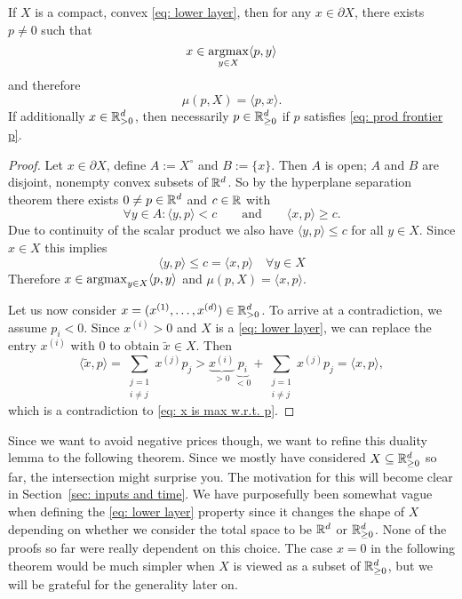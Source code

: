 \begin{lemma}
	\label{lem: duality of support function}
	If \(X\) is a compact, convex \ref{eq: lower
	layer}, then for any \(x\in \partial X\), there exists
	\(p\neq 0\) such that
	\begin{equation}
		\label{eq: prod frontier p}
		x \in \argmax_{y\in X} \langle p, y\rangle %
	\end{equation}
	and therefore
	\[
		\mu(p, X) = \langle p, x\rangle.
	\]
	If additionally \(x\in\mathbb{R}_{>0}^d\), then necessarily \(p\in\mathbb{R}_{\ge
	0}^d\) if \(p\) satisfies \eqref{eq: prod frontier p}.
\end{lemma}
\begin{proof}
	Let \(x\in \partial X\), define \(A:=X^\circ\) and \(B:=\{x\}\). Then \(A\)
	is open; \(A\) and \(B\) are disjoint, nonempty
	convex subsets of \(\mathbb{R}^d\). So by the hyperplane separation theorem
	there exists
	\(0\neq p\in\mathbb{R}^d\) and \(c\in\mathbb{R}\) with
	\[
		\forall y\in A : \langle y, p\rangle < c
		\qquad\text{and}\qquad
		\langle x, p\rangle \ge c.
	\]
	Due to continuity of the scalar product we also have \(\langle y, p\rangle
	\le c\) for all \(y\in X\). Since \(x\in X\) this implies
	\begin{equation}
		\label{eq: x is max w.r.t. p}
		\langle y, p\rangle \le c = \langle x, p\rangle \quad \forall y\in X
	\end{equation}
	Therefore \(x\in\operatorname*{argmax}_{y\in X} \langle p, y\rangle\) and \(\mu(p, X) =
	\langle x, p\rangle\).

	Let us now consider \(x=(x^{(1)},\dots,x^{(d)})\in\mathbb{R}_{>0}^d\).
	To arrive at a contradiction, we assume \(p_i < 0\). Since \(x^{(i)}>0\) and
	\(X\) is a \ref{eq: lower layer}, we can replace the entry \(x^{(i)}\) with
	\(0\) to obtain \(\tilde{x}\in X\). Then
	\[
		\langle \tilde{x}, p\rangle
		= \sum_{\substack{j=1\\i\neq j}} x^{(j)} p_j
		> \underbrace{x^{(i)}}_{>0}\underbrace{p_i}_{<0}
		+ \sum_{\substack{j=1\\i\neq j}} x^{(j)} p_j
		= \langle x, p\rangle,
	\]
	which is a contradiction to \eqref{eq: x is max w.r.t. p}.
\end{proof}

Since we want to avoid negative prices though, we want to refine this duality
lemma to the following theorem. Since we mostly have considered \(X\subseteq
\mathbb{R}_{\ge 0}^d\) so far, the intersection might surprise you. The
motivation for this will become clear in Section~\ref{sec: inputs and time}.
We have purposefully been somewhat vague when defining the \ref{eq: lower layer}
property since it changes the shape of \(X\) depending on whether we consider
the total space to be \(\mathbb{R}^d\) or \(\mathbb{R}_{\ge 0}^d\). None of the
proofs so far were really dependent on this choice. The case \(x=0\) in the
following theorem would be much simpler when \(X\) is viewed as a subset of
\(\mathbb{R}_{\ge 0}^d\), but we will be grateful for the generality later on.


